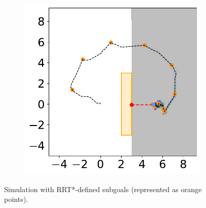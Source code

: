 \begin{figure}[H]
    \begin{subfigure}{0.35\textwidth}
        \centering
        \includegraphics[width=\textwidth]{figures/Simulations/sim_rrt/frame_9.pdf}
    \end{subfigure}
    \hspace{1em}
    \begin{subfigure}{0.35\textwidth}
        
    \end{subfigure}
    \caption[short]{Simulation with RRT*-defined subgoals (represented as orange points).}
    \label{fig:sim_rrt_frames}
\end{figure}
\thispagestyle{empty}

